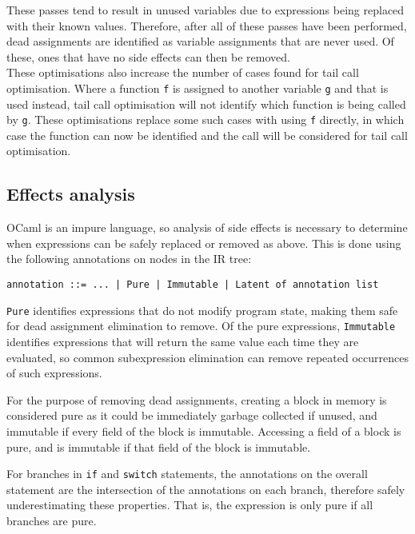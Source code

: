 These passes tend to result in unused variables due to expressions being replaced with their known values. Therefore, after all of these passes have been performed,  dead assignments are identified as variable assignments that are never used. Of these, ones that have no side effects can then be removed. \\
These optimisations also increase the number of cases found for tail call optimisation. Where a function \verb|f| is assigned to another variable \verb|g| and that is used instead, tail call optimisation will not identify which function is being called by \verb|g|. These optimisations replace some such cases with using \verb|f| directly, in which case the function can now be identified and the call will be considered for tail call optimisation.



\subsection{Effects analysis}
OCaml is an impure language, so analysis of side effects is necessary to determine when expressions can be safely replaced or removed as above. This is done using the following annotations on nodes in the IR tree:

\verb"annotation ::= ... | Pure | Immutable | Latent of annotation list"

\verb|Pure| identifies expressions that do not modify program state, making them safe for dead assignment elimination to remove. Of the pure expressions, \verb|Immutable| identifies expressions that will return the same value each time they are evaluated, so common subexpression elimination can remove repeated occurrences of such expressions.

For the purpose of removing dead assignments, creating a block in memory is considered pure as it could be immediately garbage collected if unused, and immutable if every field of the block is immutable. Accessing a field of a block is pure, and is immutable if that field of the block is immutable. 

For branches in \verb|if| and \verb|switch| statements, %
 the annotations on the overall statement are the intersection of the annotations on each branch, therefore safely underestimating these properties. That is, the expression is only pure if all branches are pure.


